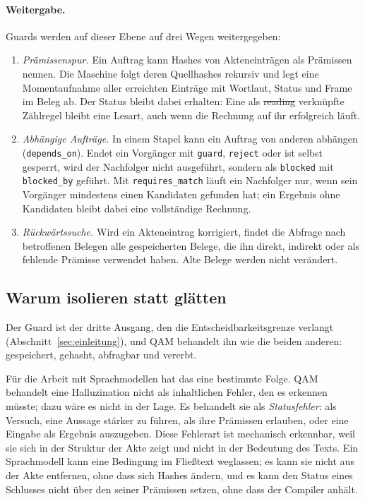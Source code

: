 \paragraph{Weitergabe.} Guards werden auf dieser Ebene auf drei Wegen weitergegeben:
\begin{enumerate}[nosep]
\item \emph{Prämissenspur.} Ein Auftrag kann Hashes von Akteneinträgen als Prämissen nennen. Die Maschine folgt deren Quellhashes
rekursiv und legt eine Momentaufnahme aller erreichten Einträge mit Wortlaut, Status und Frame im Beleg ab. Der Status bleibt dabei
erhalten: Eine als \st{reading} verknüpfte Zählregel bleibt eine Lesart, auch wenn die Rechnung auf ihr erfolgreich läuft.
\item \emph{Abhängige Aufträge.} In einem Stapel kann ein Auftrag von anderen abhängen (\texttt{depends\_on}). Endet ein Vorgänger mit
\texttt{guard}, \texttt{reject} oder ist selbst gesperrt, wird der Nachfolger nicht ausgeführt, sondern als \texttt{blocked} mit
\texttt{blocked\_by} geführt. Mit \texttt{requires\_match} läuft ein Nachfolger nur, wenn sein Vorgänger mindestens einen Kandidaten gefunden
hat; ein Ergebnis ohne Kandidaten bleibt dabei eine vollständige Rechnung.
\item \emph{Rückwärtssuche.} Wird ein Akteneintrag korrigiert, findet die Abfrage nach betroffenen Belegen alle gespeicherten Belege, die
ihn direkt, indirekt oder als fehlende Prämisse verwendet haben. Alte Belege werden nicht verändert.
\end{enumerate}

\subsection{Warum isolieren statt glätten}

Der Guard ist der dritte Ausgang, den die Entscheidbarkeitsgrenze verlangt (Abschnitt~\ref{sec:einleitung}), und QAM behandelt ihn wie
die beiden anderen: gespeichert, gehasht, abfragbar und vererbt.

Für die Arbeit mit Sprachmodellen hat das eine bestimmte Folge. QAM behandelt eine Halluzination nicht als inhaltlichen Fehler, den es
erkennen müsste; dazu wäre es nicht in der Lage. Es behandelt sie als \emph{Statusfehler}: als Versuch, eine Aussage stärker zu führen, als ihre
Prämissen erlauben, oder eine Eingabe als Ergebnis auszugeben. Diese Fehlerart ist mechanisch erkennbar, weil sie sich in der Struktur
der Akte zeigt und nicht in der Bedeutung des Texts. Ein Sprachmodell kann eine Bedingung im Fließtext weglassen; es kann sie nicht aus der
Akte entfernen, ohne dass sich Hashes ändern, und es kann den Status eines Schlusses nicht über den seiner Prämissen setzen, ohne dass der
Compiler anhält.
